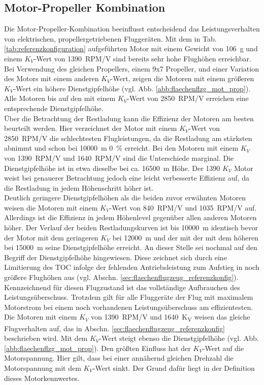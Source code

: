 \subsection{Motor-Propeller Kombination}
\label{subsec:mot_prop_kombi}
Die Motor-Propeller-Kombination beeinflusst entscheidend das Leistungsverhalten von elektrischen, propellergetriebenen Fluggeräten. Mit dem in Tab. \ref{tab:referenzkonfiguration} aufgeführten Motor mit einem Gewicht von \SI{106}{g} und einem \ensuremath{K_V}-Wert von \SI{1390}{RPM/V} sind bereits sehr hohe Flughöhen erreichbar. Bei Verwendung des gleichen Propellers, einem 9x7 Propeller, und einer Variation des Motors mit einem anderen \ensuremath{K_V}-Wert, zeigen die Motoren mit einem größeren \ensuremath{K_V}-Wert ein höhere Dienstgipfelhöhe (vgl. Abb. \ref{abb:flaechenflzg_mot_prop}). Alle Motoren bis auf den mit einem \ensuremath{K_V}-Wert von \SI{2850}{RPM/V} erreichen eine entsprechende Dienstgipfelhöhe.\\
Über die Betrachtung der Restladung kann die Effizienz der Motoren am besten beurteilt werden. Hier verzeichnet der Motor mit einem \ensuremath{K_V}-Wert von \SI{2850}{RPM/V} die schlechtesten Flugleistungen, da die Restladung am stärksten abnimmt und schon bei \SI{10000}{m} \SI{0}{\%} erreicht. Bei den Motoren mit einem \ensuremath{K_V} von \SI{1390}{RPM/V} und \SI{1640}{RPM/V} sind die Unterschiede marginal. Die Dienstgipfelhöhe ist in etwa dieselbe bei ca. \SI{16500}{m} Höhe. Der \SI{1390}{} \ensuremath{K_V} Motor weist bei genauerer Betrachtung jedoch eine leicht verbesserte Effizienz auf, da die Restladung in jedem Höhenschritt höher ist. \\
Deutlich geringere Dienstgipfelhöhen als die beiden zuvor erwähnten Motoren weisen die Motoren mit einem \ensuremath{K_V}-Wert von \SI{840}{RPM/V} und \SI{1035}{RPM/V} auf. Allerdings ist die Effizienz in jedem Höhenlevel gegenüber allen anderen Motoren höher. Der Verlauf der beiden Restladungskurven ist bis \SI{10000}{m} identisch bevor der Motor mit dem geringeren \ensuremath{K_V} bei \SI{12000}{m} und der mit der mit dem höheren bei \SI{15000}{m} seine Dienstgipfelhöhe erreicht. 
An dieser Stelle sei nochmal auf den Begriff der Dienstgipfelhöhe hingewiesen. Diese zeichnet sich durch eine Limitierung des TOC infolge der fehlenden Antriebsleistung zum Aufstieg in noch größere Flughöhen aus (vgl. Abschn. \ref{sec:flaechenflugzeug_referenzkonfig}). Kennzeichnend für diesen Flugzustand ist das vollständige Aufbrauchen des Leistungsüberschuss. Trotzdem gilt für alle Fluggeräte der Flug mit maximalem Motorstrom bei einem noch vorhandenen Leistungsüberschuss am effizientesten.
Die Motoren mit einem \ensuremath{K_V} von \SI{1390}{RPM/V} und \SI{1640}{K_V} weisen das gleiche Flugverhalten auf, das in Abschn. \ref{sec:flaechenflugzeug_referenzkonfig} beschrieben wird.
Mit dem \ensuremath{K_V}-Wert steigt ebenso die Dienstgipfelhöhe (vgl. Abb. \ref{abb:flaechenflzg_mot_prop}). Den größten Einfluss hat der \ensuremath{K_V}-Wert auf die Motorspannung. Hier gilt, dass bei einer annähernd gleichen Drehzahl die Motorspannung mit dem \ensuremath{K_V}-Wert sinkt. Der Grund dafür liegt in der Definition dieses Motorkennwertes.\\

